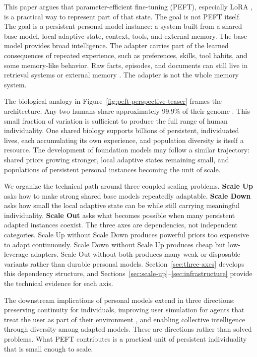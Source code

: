 \documentclass{llmxive}
\providecommand{\pony}[1]{#1}
\begin{document}
\pony{This paper argues that parameter-efficient fine-tuning (PEFT), especially LoRA \citep{hu2021lora}, is a practical way to represent part of that state. The goal is not PEFT itself. The goal is a persistent personal model instance: a system built from a shared base model, local adaptive state, context, tools, and external memory. The base model provides broad intelligence. The adapter carries part of the learned consequences of repeated experience, such as preferences, skills, tool habits, and some memory-like behavior. Raw facts, episodes, and documents can still live in retrieval systems or external memory \citep{packer2024memgpt,zhong2024memorybank}. The adapter is not the whole memory system.}

\pony{The biological analogy in Figure~\ref{fig:peft-perspective-teaser} frames the architecture. Any two humans share approximately 99.9\% of their genome \citep{1000genomes2012}. This small fraction of variation is sufficient to produce the full range of human individuality. One shared biology supports billions of persistent, individuated lives, each accumulating its own experience, and population diversity is itself a resource. The development of foundation models may follow a similar trajectory: shared priors growing stronger, local adaptive states remaining small, and populations of persistent personal instances becoming the unit of scale.}

\pony{We organize the technical path around three coupled scaling problems. \textbf{Scale Up} asks how to make strong shared base models repeatedly adaptable. \textbf{Scale Down} asks how small the local adaptive state can be while still carrying meaningful individuality. \textbf{Scale Out} asks what becomes possible when many persistent adapted instances coexist. The three axes are dependencies, not independent categories. Scale Up without Scale Down produces powerful priors too expensive to adapt continuously. Scale Down without Scale Up produces cheap but low-leverage adapters. Scale Out without both produces many weak or disposable variants rather than durable personal models. Section~\ref{sec:three-axes} develops this dependency structure, and Sections~\ref{sec:scale-up}--\ref{sec:infrastructure} provide the technical evidence for each axis.}

\pony{The downstream implications of personal models extend in three directions: preserving continuity for individuals, improving user simulation for agents that treat the user as part of their environment \citep{park2023generative,oasis2024}, and enabling collective intelligence through diversity among adapted models. These are directions rather than solved problems. What PEFT contributes is a practical unit of persistent individuality that is small enough to scale.}
\end{document}
